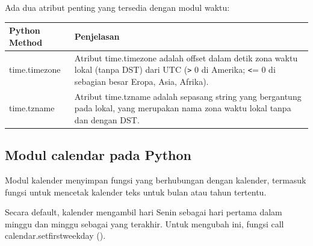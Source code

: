 Ada dua atribut penting yang tersedia dengan modul waktu:

\begin{center}
\begin{tabular}{ | m{4cm} | m{4cm} | }
\hline
Python Method & Penjelasan \\
\hline
time.timezone & Atribut time.timezone adalah offset dalam detik zona waktu lokal (tanpa DST) dari UTC (\texttt{>} 0 di Amerika; \texttt{<}= 0 di sebagian besar Eropa, Asia, Afrika). \\
\hline
time.tzname & Atribut time.tzname adalah sepasang string yang bergantung pada lokal, yang merupakan nama zona waktu lokal tanpa dan dengan DST. \\
\hline
\end{tabular}
\end{center}

\subsection{Modul calendar pada Python}
Modul kalender menyimpan fungsi yang berhubungan dengan kalender, termasuk fungsi untuk mencetak kalender teks untuk bulan atau tahun tertentu.

Secara default, kalender mengambil hari Senin sebagai hari pertama dalam minggu dan minggu sebagai yang terakhir. Untuk mengubah ini, fungsi call calendar.setfirstweekday ().

